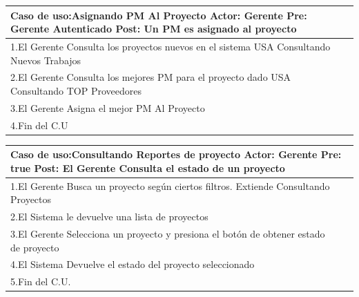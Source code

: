 \begin{longtable}{|p{}|p{}|}
    \hline
    \multicolumn{2}{|p{16cm}|}{
        \textbf{Caso de uso:}Asignando PM Al Proyecto\newline
        \textbf{Actor:} Gerente\newline
        \textbf{Pre: }Gerente Autenticado\newline
        \textbf{Post:} Un PM es asignado al proyecto
    }\\
    \hline
    1.El Gerente Consulta los proyectos nuevos en el sistema USA Consultando Nuevos Trabajos&    \\
    \hline
    2.El Gerente Consulta los mejores PM para el proyecto dado USA Consultando TOP Proveedores& \\
    \hline
    3.El Gerente Asigna el mejor PM Al Proyecto&\\
    \hline
    4.Fin del C.U&\\
    \hline
\end{longtable}


\begin{longtable}{|p{}|p{}|}
    \hline
    \multicolumn{2}{|p{16cm}|}{
        \textbf{Caso de uso:}Consultando Reportes de proyecto\newline
        \textbf{Actor:} Gerente\newline
        \textbf{Pre: }true\newline
        \textbf{Post:}  El Gerente Consulta el estado de un proyecto
    }\\
    \hline
    1.El Gerente Busca un proyecto según ciertos filtros. Extiende Consultando Proyectos&    \\
    \hline
    2.El Sistema le devuelve una lista de proyectos& \\
    \hline
    3.El Gerente Selecciona un proyecto y presiona el botón de obtener estado de proyecto&\\
    \hline
    4.El Sistema Devuelve el estado del proyecto seleccionado &\\
    \hline
    5.Fin del C.U.&\\
    \hline
\end{longtable}

